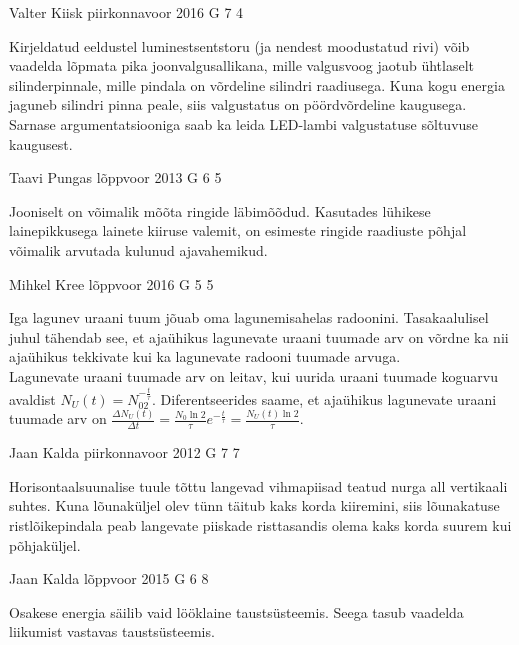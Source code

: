 \documentclass[11pt]{article}
\begin{document}
{%
{Valter Kiisk} %
{piirkonnavoor} %
{2016} %
{G 7} %
{4} %
{

\ifHint
Kirjeldatud eeldustel luminestsentstoru (ja nendest moodustatud rivi) võib vaadelda lõpmata pika joonvalgusallikana, mille valgusvoog jaotub ühtlaselt silinderpinnale, mille pindala on võrdeline silindri raadiusega. Kuna kogu energia jaguneb silindri pinna peale, siis valgustatus on pöördvõrdeline kaugusega. Sarnase argumentatsiooniga saab ka leida LED-lambi valgustatuse sõltuvuse kaugusest.
\fi
}

{Taavi Pungas} %
{lõppvoor} %
{2013} %
{G 6} %
{5} %
{

\ifHint
Jooniselt on võimalik mõõta ringide läbimõõdud. Kasutades lühikese lainepikkusega lainete kiiruse valemit, on esimeste ringide raadiuste põhjal võimalik arvutada kulunud ajavahemikud.
\fi
}

{Mihkel Kree} %
{lõppvoor} %
{2016} %
{G 5} %
{5} %
{

\ifHint
Iga lagunev uraani tuum jõuab oma lagunemisahelas radoonini. Tasakaalulisel juhul tähendab see, et ajaühikus lagunevate uraani tuumade arv on võrdne ka nii ajaühikus tekkivate kui ka lagunevate radooni tuumade arvuga.\\
Lagunevate uraani tuumade arv on leitav, kui uurida uraani tuumade koguarvu avaldist $N_U(t) = N_02^{-\frac{t}{\tau}}$. Diferentseerides saame, et ajaühikus lagunevate uraani tuumade arv on $\frac{\Delta N_U(t)}{\Delta t} = \frac{N_0\ln 2}{\tau}e^{-\frac{t}{\tau}} = \frac{N_U(t)\ln 2}{\tau}$. 
\fi
}

{Jaan Kalda} %
{piirkonnavoor} %
{2012} %
{G 7} %
{7} %
{

\ifHint
Horisontaalsuunalise tuule tõttu langevad vihmapiisad teatud nurga all vertikaali suhtes. Kuna lõunaküljel olev tünn täitub kaks korda kiiremini, siis lõunakatuse ristlõikepindala peab langevate piiskade risttasandis olema kaks korda suurem kui põhjaküljel.
\fi
}

{Jaan Kalda} %
{lõppvoor} %
{2015} %
{G 6} %
{8} %
{

\ifHint
Osakese energia säilib vaid lööklaine taustsüsteemis. Seega tasub vaadelda liikumist vastavas taustsüsteemis.
\fi
}

}
\end{document}
